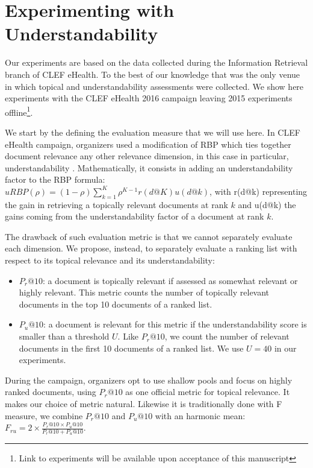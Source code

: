 %

%

\section{Experimenting with Understandability}
\label{sec:experiments}

Our experiments are based on the data collected during the Information Retrieval branch of CLEF eHealth. To the best of our knowledge that was the only venue in which topical and understandability assessments were collected. 
We show here experiments with the CLEF eHealth 2016 campaign leaving 2015 experiments offline\footnote{Link to experiments will be available upon acceptance of this manuscript}.

We start by the defining the evaluation measure that we will use here. 
In CLEF eHealth campaign, organizers used a modification of RBP which ties together document relevance any other relevance dimension, in this case in particular, understandability \cite{clef16}.
Mathematically, it consists in adding an understandability factor to the RBP formula: $uRBP(\rho) = (1 - \rho) \sum_{k=1}^{K} \rho^{K-1} r(d@K) u(d@k)$, with r(d@k) representing the gain in retrieving a topically relevant documents at rank $k$ and u(d@k) the gains coming from the understandability factor of a document at rank $k$.

The drawback of such evaluation metric is that we cannot separately evaluate each dimension. We propose, instead, to separately evaluate a ranking list with respect to its topical relevance and its understandability:
\begin{itemize}
        \item $P_r@10$: a document is topically relevant if assessed as somewhat relevant or highly relevant. This metric counts the number of topically relevant documents in the top 10 documents of a ranked list.
        \item $P_u@10$: a document is relevant for this metric if the understandability score is smaller than a threshold $U$. Like $P_r@10$, we count the number of relevant documents in the first 10 documents of a ranked list. We use $U = 40$ in our experiments. 
\end{itemize}

During the campaign, organizers opt to use shallow pools and focus on highly ranked documents, using $P_r@10$ as one official metric for topical relevance.
It makes our choice of metric natural. Likewise it is traditionally done with F measure, we combine $P_r@10$ and $P_u@10$ with an harmonic mean: $F_{ru} = 2 \times \frac{P_r@10 \times P_u@10}{P_r@10 + P_u@10}$. 

